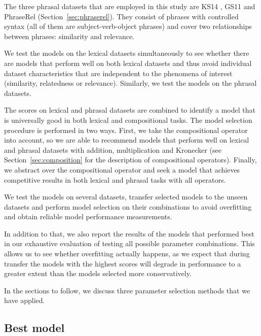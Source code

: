 The three phrasal  datasets that are employed in this study are KS14 \cite{kartsadrqpl2014}, GS11 \cite{Grefenstette:2011:ESC:2145432.2145580} and PhraseRel (Section~\ref{sec:phraserel}). They consist of phrases with controlled syntax (all of them are subject-verb-object phrases) and cover two relationships between phrases: similarity and relevance.

We test the models on the lexical datasets simultaneously to see whether there are models that perform well on both lexical datasets and thus avoid individual dataset characteristics that are independent to the phenomena of interest (similarity, relatedness or relevance). Similarly, we test the models on the phrasal datasets.

The scores on lexical and phrasal datasets are combined to identify a model that is universally good in both lexical and compositional tasks. The model selection procedure is performed in two ways. First, we take the compositional operator into account, so we are able to recommend models that perform well on lexical and phrasal datasets with addition, multiplication and Kronecker (see Section~\ref{sec:composition} for the description of compositional operators). Finally, we abstract over the compositional operator and seek a model that achieves competitive results in both lexical and phrasal tasks with all operators.
%

We test the models on several datasets, transfer selected models to the unseen datasets and perform model selection on their combinations to avoid overfitting and obtain reliable model performance measurements.

In addition to that, we also report the results of the models that performed best in our exhaustive evaluation of testing all possible parameter combinations. This allows us to see whether overfitting actually happens, as we expect that during transfer the models with the highest scores will degrade in performance to a greater extent than the models selected more conservatively.

In the sections to follow, we discuss three parameter selection methods that we have applied.

\subsection{Best model}

